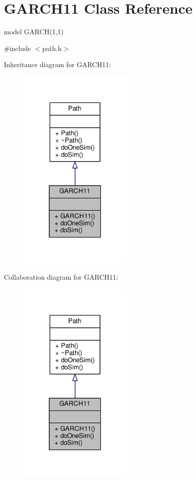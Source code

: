 \hypertarget{classGARCH11}{}\section{G\+A\+R\+C\+H11 Class Reference}
\label{classGARCH11}


model G\+A\+R\+C\+H(1,1)  




{\ttfamily \#include $<$path.\+h$>$}



Inheritance diagram for G\+A\+R\+C\+H11\+:
\nopagebreak
\begin{figure}[H]
\begin{center}
\leavevmode
\includegraphics[width=159pt]{classGARCH11__inherit__graph}
\end{center}
\end{figure}


Collaboration diagram for G\+A\+R\+C\+H11\+:
\nopagebreak
\begin{figure}[H]
\begin{center}
\leavevmode
\includegraphics[width=159pt]{classGARCH11__coll__graph}
\end{center}
\end{figure}

